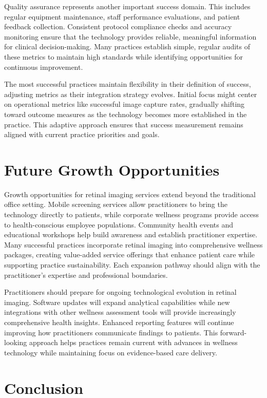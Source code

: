 \documentclass[
  Letterpaper,
]{scrbook}
\begin{document}
Quality assurance represents another important success domain. This
includes regular equipment maintenance, staff performance evaluations,
and patient feedback collection. Consistent protocol compliance checks
and accuracy monitoring ensure that the technology provides reliable,
meaningful information for clinical decision-making. Many practices
establish simple, regular audits of these metrics to maintain high
standards while identifying opportunities for continuous improvement.

The most successful practices maintain flexibility in their definition
of success, adjusting metrics as their integration strategy evolves.
Initial focus might center on operational metrics like successful image
capture rates, gradually shifting toward outcome measures as the
technology becomes more established in the practice. This adaptive
approach ensures that success measurement remains aligned with current
practice priorities and goals.

\section{Future Growth Opportunities}\label{future-growth-opportunities}

Growth opportunities for retinal imaging services extend beyond the
traditional office setting. Mobile screening services allow
practitioners to bring the technology directly to patients, while
corporate wellness programs provide access to health-conscious employee
populations. Community health events and educational workshops help
build awareness and establish practitioner expertise. Many successful
practices incorporate retinal imaging into comprehensive wellness
packages, creating value-added service offerings that enhance patient
care while supporting practice sustainability. Each expansion pathway
should align with the practitioner's expertise and professional
boundaries.

Practitioners should prepare for ongoing technological evolution in
retinal imaging. Software updates will expand analytical capabilities
while new integrations with other wellness assessment tools will provide
increasingly comprehensive health insights. Enhanced reporting features
will continue improving how practitioners communicate findings to
patients. This forward-looking approach helps practices remain current
with advances in wellness technology while maintaining focus on
evidence-based care delivery.

\section{Conclusion}\label{conclusion-1}
\end{document}
